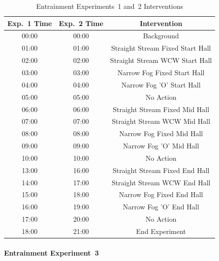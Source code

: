 \documentclass[12pt,oneside]{book}
\begin{document}
\begin{table}[H]
	\centering
	\caption{Entrainment Experiments~1 and~2 Interventions}
	\begin{tabular}{|c|c|c|} 
		\hline
		Exp.~1 Time 	& 	Exp.~2 Time 	& 	Intervention 	\\ \hline \hline
			00:00 		& 	00:00  			& 	Background	\\ \hline
			01:00	 	& 	01:00  			& 	Straight Stream Fixed Start Hall 	\\ \hline
			02:00		& 	02:00  			& 	Straight Stream WCW Start Hall 	\\ \hline
			03:00	 	& 	03:00  			& 	Narrow Fog Fixed Start Hall 	\\ \hline
			04:00		& 	04:00  			& 	Narrow Fog 'O' Start Hall 	\\ \hline
			05:00		& 	05:00  			&	No Action 	\\ \hline
			06:00		& 	06:00  			& 	Straight Stream Fixed Mid Hall 	\\ \hline
			07:00		& 	07:00  			& 	Straight Stream WCW Mid Hall 	\\ \hline
			08:00		& 	08:00  			& 	Narrow Fog Fixed Mid Hall 	\\ \hline
			09:00		& 	09:00  			& 	Narrow Fog 'O' Mid Hall 	\\ \hline
			10:00		& 	10:00  			& 	No Action 	\\ \hline
			13:00		& 	16:00  			& 	Straight Stream Fixed End Hall 	\\ \hline
			14:00		& 	17:00  			& 	Straight Stream WCW End Hall 	\\ \hline
			15:00		& 	18:00  			& 	Narrow Fog Fixed End Hall 	\\ \hline
			16:00		& 	19:00  			& 	Narrow Fog 'O' End Hall 	\\ \hline
			17:00		& 	20:00  			& 	No Action 	\\ \hline
			18:00		& 	21:00  			& 	End Experiment 	\\ \hline
	\end{tabular}
	\label{Table:EntExp1_and_2_Interventions}
\end{table}

\FloatBarrier

\paragraph{Entrainment Experiment~3} \mbox{}

\end{document}
